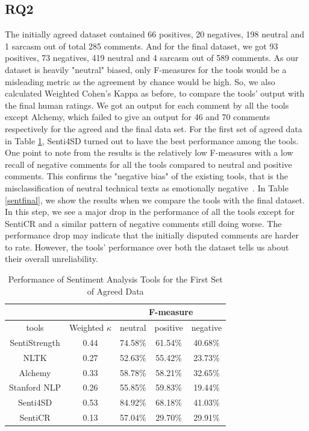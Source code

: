 \subsection{RQ2}
The initially agreed dataset contained 
66 positives, 20 negatives, 198 neutral and 1 sarcasm 
out of total 285 comments. 
And for the final dataset, 
we got 93 positives, 73 negatives, 419 neutral and 4 sarcasm 
out of 589 comments. 
As our dataset is heavily "neutral" biased, 
only F-measures for the tools would be a misleading metric 
as the agreement by chance would be high. 
So, we also calculated Weighted Cohen's Kappa as before, 
to compare the tools' output with the final human ratings. 
We got an output for each comment by all the tools except Alchemy, which failed to give an output for 46 and 70 comments respectively for the agreed and the final data set. 
For the first set of agreed data in Table \ref{sentfirst}, 
Senti4SD turned out to have the best performance among the tools. 
One point to note from the results is 
the relatively low F-measures with a low recall 
of negative comments 
for all the tools compared to 
neutral and positive comments. 
This confirms the "negative bias" of the existing tools, 
that is the misclassification of neutral technical texts 
as emotionally negative~\cite{blaz2016sentiment,novielli2015challenges,calefato2017sentiment}.
In Table \ref{sentfinal}, we show the results 
when we compare the tools with the final dataset. 
In this step, 
we see a major drop in the performance 
of all the tools 
except for SentiCR
and a similar pattern of negative comments 
still doing worse.
The performance drop may indicate
that the initially disputed comments
are harder to rate.
However, the tools' performance 
over both the dataset 
tells us about their overall unreliability.


\vspace{3mm}
\noindent{}

\begin{table}
\centering
\caption{Performance of Sentiment Analysis Tools for the First Set of  Agreed Data}
\label{sentfirst}
\begin{tabular}{|c|c|c|c|c|}
\hline
\multicolumn{2}{|c|}{ } & \multicolumn{3}{c|}{ F-measure } \\
\hline
tools & Weighted $\kappa$ & neutral & positive & negative \\
\hline
SentiStrength & 0.44 & 74.58\% & 61.54\% & 40.68\% \\
\hline
NLTK & 0.27 & 52.63\% & 55.42\% & 23.73\% \\
\hline
Alchemy & 0.33 & 58.78\% & 58.21\% & 32.65\% \\
\hline
Stanford NLP & 0.26 & 55.85\% & 59.83\% & 19.44\% \\
\hline
Senti4SD & 0.53 & 84.92\% & 68.18\% & 41.03\% \\
\hline
SentiCR & 0.13 & 57.04\% & 29.70\% & 29.91\% \\
\hline
\end{tabular}
\end{table}

